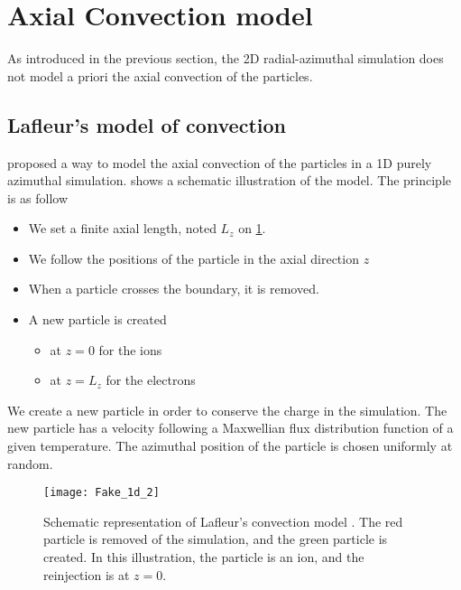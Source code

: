 
\section{Axial Convection model}
  \label{sec-reinjectionnoise}

  As introduced in the previous section, the \ac{2D} radial-azimuthal simulation does not model a priori the axial convection of the particles.

  \subsection{Lafleur's model of convection}

    \citet{lafleur2016a} proposed a way to model the axial convection of the particles in a \ac{1D} purely azimuthal simulation.
     shows a schematic illustration of the model.
    The principle is as follow
    \begin{itemize}
      \item We set a finite axial length, noted $L_z$ on \cref{fig-Fake_1d_1}.
      \item We follow the positions of the particle in the axial direction $z$
      \item When a particle crosses the boundary, it is removed.
      \item A new particle is created
      \begin{itemize}
        \item at $z=0$ for the ions
        \item  at $z=L_z$ for the electrons
      \end{itemize}
    \end{itemize}

    We create a new particle in order to conserve the charge in the simulation.
    The new particle has a velocity following a Maxwellian flux distribution function of a given temperature.
    The azimuthal position of the particle is chosen uniformly at random.


    \begin{figure}[hbtp]
      \centering
      \texttt{[image: Fake\_1d\_2]}
      \caption{Schematic representation of Lafleur's convection model \citep{lafleur2016a}. The red particle is removed of the simulation, and the green particle is created. In this illustration, the particle is an ion, and the reinjection is at $z=0$. }
      \label{fig-Fake_1d_1}
    \end{figure}


